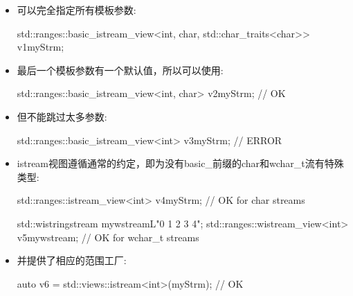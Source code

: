 \begin{itemize}
\item
可以完全指定所有模板参数:

\begin{cpp}
std::ranges::basic_istream_view<int, char, std::char_traits<char>> v1{myStrm};
\end{cpp}

\item
最后一个模板参数有一个默认值，所以可以使用:

\begin{cpp}
std::ranges::basic_istream_view<int, char> v2{myStrm}; // OK
\end{cpp}

\item
但不能跳过太多参数:

\begin{cpp}
std::ranges::basic_istream_view<int> v3{myStrm}; // ERROR
\end{cpp}

\item
istream视图遵循通常的约定，即为没有basic\_前缀的char和wchar\_t流有特殊类型:

\begin{cpp}
std::ranges::istream_view<int> v4{myStrm}; // OK for char streams

std::wistringstream mywstream{L"0 1 2 3 4"};
std::ranges::wistream_view<int> v5{mywstream}; // OK for wchar_t streams
\end{cpp}

\item
并提供了相应的范围工厂:

\begin{cpp}
auto v6 = std::views::istream<int>(myStrm); // OK
\end{cpp}
\end{itemize}


